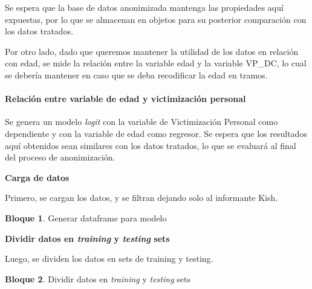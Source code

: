 \documentclass[]{book}
\newenvironment{Shaded}{\begin{snugshade}}{\end{snugshade}}
\newcommand{\DecValTok}[1]{\textcolor[rgb]{0.00,0.00,0.81}{#1}}
\newcommand{\NormalTok}[1]{#1}
\newcommand{\OperatorTok}[1]{\textcolor[rgb]{0.81,0.36,0.00}{\textbf{#1}}}
\newcommand{\StringTok}[1]{\textcolor[rgb]{0.31,0.60,0.02}{#1}}
\let\oldparagraph\paragraph
\renewcommand{\paragraph}[1]{\oldparagraph{#1}\mbox{}}
\theoremstyle{definition}
\theoremstyle{definition}
\newtheorem{example}{Bloque}[chapter]
\theoremstyle{definition}
\theoremstyle{definition}
\theoremstyle{remark}
\begin{document}
Se espera que la base de datos anonimizada mantenga las propiedades aquí expuestas, por lo que se almacenan en objetos para su posterior comparación con los datos tratados.

Por otro lado, dado que queremos mantener la utilidad de los datos en relación con edad, se mide la relación entre la variable edad y la variable VP\_DC, lo cual se debería mantener en caso que se deba recodificar la edad en tramos.

\hypertarget{relaciuxf3n-entre-variable-de-edad-y-victimizaciuxf3n-personal}{%
\paragraph{Relación entre variable de edad y victimización personal}\label{relaciuxf3n-entre-variable-de-edad-y-victimizaciuxf3n-personal}}

Se genera un modelo \emph{logit} con la variable de Victimización Personal como dependiente y con la variable de edad como regresor. Se espera que los resultados aquí obtenidos sean similares con los datos tratados, lo que se evaluará al final del proceso de anonimización.

\textbf{Carga de datos}

Primero, se cargan los datos, y se filtran dejando solo al informante Kish.

\begin{example}
\protect\hypertarget{exm:bloque14nbm}{}{\label{exm:bloque14nbm} }Generar dataframe para modelo
\end{example}

\begin{Shaded}
\end{Shaded}

\textbf{Dividir datos en \emph{training} y \emph{testing} sets}

Luego, se dividen los datos en sets de training y testing.

\begin{example}
\protect\hypertarget{exm:bloque15nbm}{}{\label{exm:bloque15nbm} }Dividir datos en \emph{training} y \emph{testing} sets
\end{example}
\end{document}
